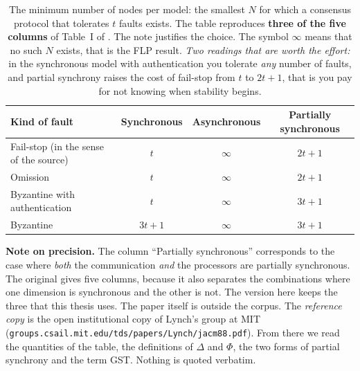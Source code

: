 \begin{table}[t]
\centering
\caption[The minimum number of nodes per model: the smallest $N$ for
which a consensus protocol that tolerates $t$ faults exists.]%
{The minimum number of nodes per model: the smallest $N$ for which a
consensus protocol that tolerates $t$ faults exists. The table
reproduces \textbf{three of the five columns} of Table~I of
\cite{dwork1988consensus}. The note justifies the choice. The symbol
$\infty$ means that no such $N$ exists, that is the FLP result.
\emph{Two readings that are worth the effort:} in the synchronous model
with authentication you tolerate \emph{any} number of faults, and
partial synchrony raises the cost of fail-stop from $t$ to $2t{+}1$,
that is you pay for not knowing when stability begins.}
\label{tab:dls}
\small
\begin{tabularx}{\linewidth}{@{}X c c c@{}}
\toprule
\textbf{Kind of fault} & \textbf{Synchronous} & \textbf{Asynchronous} &
\textbf{Partially synchronous} \\
\midrule
Fail-stop (in the sense of the source) & $t$ & $\infty$ & $2t+1$ \\
Omission                  & $t$      & $\infty$ & $2t+1$ \\
Byzantine with authentication & $t$  & $\infty$ & $3t+1$ \\
Byzantine                 & $3t+1$   & $\infty$ & $3t+1$ \\
\bottomrule
\end{tabularx}

\vspace{4pt}
\begin{minipage}{0.94\linewidth}\small
\textbf{Note on precision.} The column \enquote{Partially synchronous}
corresponds to the case where \emph{both} the communication \emph{and}
the processors are partially synchronous. The original gives five
columns, because it also separates the combinations where one dimension
is synchronous and the other is not. The version here keeps the three
that this thesis uses. The paper itself is outside the corpus. The
\emph{reference copy} is the open institutional copy of Lynch's group at
MIT (\texttt{groups.csail.mit.edu/tds/papers/Lynch/jacm88.pdf}). From
there we read the quantities of the table, the definitions of $\Delta$
and $\Phi$, the two forms of partial synchrony and the term GST. Nothing
is quoted verbatim.


\end{minipage}
\end{table}

